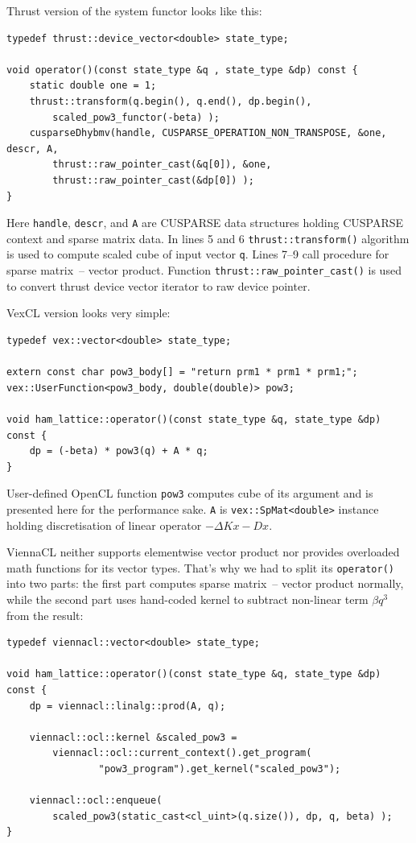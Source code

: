 \documentclass[1p]{elsarticle}
\newcommand{\code}[1]{\lstinline|#1|}
\begin{document}
Thrust version of the system functor looks like this:
\begin{lstlisting}[frame=leftline]
typedef thrust::device_vector<double> state_type;

void operator()(const state_type &q , state_type &dp) const {
    static double one = 1;
    thrust::transform(q.begin(), q.end(), dp.begin(),
	    scaled_pow3_functor(-beta) );
    cusparseDhybmv(handle, CUSPARSE_OPERATION_NON_TRANSPOSE, &one, descr, A,
	    thrust::raw_pointer_cast(&q[0]), &one,
	    thrust::raw_pointer_cast(&dp[0]) );
}
\end{lstlisting}
Here \code{handle}, \code{descr}, and \code{A} are CUSPARSE data structures
holding CUSPARSE context and sparse matrix data. In lines 5 and 6
\code{thrust::transform()} algorithm is used to compute scaled cube of input
vector \code{q}. Lines 7--9 call procedure for sparse matrix~-- vector product.
Function \code{thrust::raw_pointer_cast()} is used to convert thrust device
vector iterator to raw device pointer.

VexCL version looks very simple:
\begin{lstlisting}[frame=leftline]
typedef vex::vector<double> state_type;

extern const char pow3_body[] = "return prm1 * prm1 * prm1;";
vex::UserFunction<pow3_body, double(double)> pow3;

void ham_lattice::operator()(const state_type &q, state_type &dp) const {
    dp = (-beta) * pow3(q) + A * q;
}
\end{lstlisting}

User-defined OpenCL function \code{pow3} computes cube of its argument and is
presented here for the performance sake. \code{A} is \code{vex::SpMat<double>}
instance holding discretisation of linear operator $-\Delta Kx - Dx$.

ViennaCL neither supports elementwise vector product nor provides
overloaded math functions for its vector types. That's why we had to split its
\code{operator()} into two parts: the first part computes sparse matrix~--
vector product normally, while the second part uses hand-coded kernel to
subtract non-linear term $\beta q^3$ from the result:
\begin{lstlisting}[frame=leftline]
typedef viennacl::vector<double> state_type;

void ham_lattice::operator()(const state_type &q, state_type &dp) const {
    dp = viennacl::linalg::prod(A, q);

    viennacl::ocl::kernel &scaled_pow3 =
        viennacl::ocl::current_context().get_program(
                "pow3_program").get_kernel("scaled_pow3");

    viennacl::ocl::enqueue(
        scaled_pow3(static_cast<cl_uint>(q.size()), dp, q, beta) );
}
\end{lstlisting}
\end{document}
